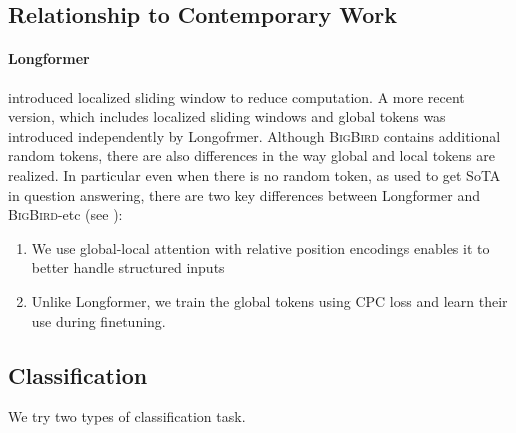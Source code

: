 \documentclass{article}
\newcommand{\bigb}{\textsc{BigBird}\xspace}
\begin{document}
\subsection{Relationship to Contemporary Work} \label{sec:app-related-work}

\paragraph{Longformer}
\citet{child2019generating} introduced localized sliding window to reduce computation.
A more recent version, which includes localized sliding windows and global tokens was introduced independently by
Longofrmer\citep{beltagy2020longformer}. Although \bigb contains additional random tokens, there are also differences in the way global and local tokens are realized. In particular even when there is no random token, as used to get SoTA in question answering, there are two key differences between Longformer and \bigb-etc (see \citep{ainslie2020etc}):
\begin{enumerate}
    \item We use global-local attention with relative
position encodings enables it to better handle structured inputs
    \item Unlike Longformer, we train the global tokens using CPC loss and learn their use during finetuning.
\end{enumerate}

\subsection{Classification}
\label{sec:app-expt-nlp:cls}
We try two types of classification task.
\end{document}
